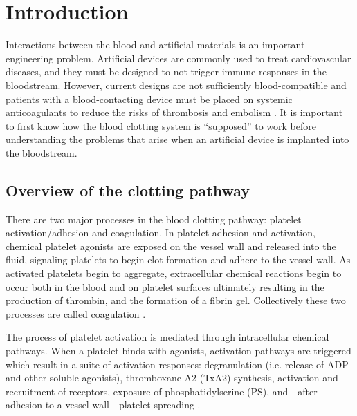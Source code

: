 
\chapter{Introduction}
\label{cha:introduction}


Interactions between the blood and artificial materials is an
important engineering problem. Artificial devices are commonly used to
treat cardiovascular diseases, and they must be designed to not
trigger immune responses in the bloodstream. However, current designs
are not sufficiently blood-compatible and patients with a
blood-contacting device must be placed on systemic anticoagulants to
reduce the risks of thrombosis and embolism
\cite{Ratner1993,Ratner2007,Oprea13}. It is important to first know
how the blood clotting system is ``supposed'' to work before
understanding the problems that arise when an artificial device is
implanted into the bloodstream.
	

\section{Overview of the clotting pathway}
\label{sec:overview-clotting}

There are two major processes in the blood clotting pathway: platelet
activation/adhesion and coagulation. In platelet adhesion and
activation, chemical platelet agonists are exposed on the vessel wall
and released into the fluid, signaling platelets to begin clot
formation and adhere to the vessel wall. As activated platelets begin
to aggregate, extracellular chemical reactions begin to occur both in
the blood and on platelet surfaces ultimately resulting in the
production of thrombin, and the formation of a fibrin
gel. Collectively these two processes are called coagulation
\cite{Fogelson2015}. 

The process of platelet activation is mediated through
intracellular chemical pathways. When a platelet binds with agonists,
activation pathways are triggered which result in a suite of
activation responses: degranulation (i.e. release of ADP and other
soluble agonists), thromboxane A2 (TxA2) synthesis, activation and
recruitment of  receptors, exposure of
phosphatidylserine (PS), and---after adhesion to a vessel
wall---platelet spreading \cite{Bye2016}.

